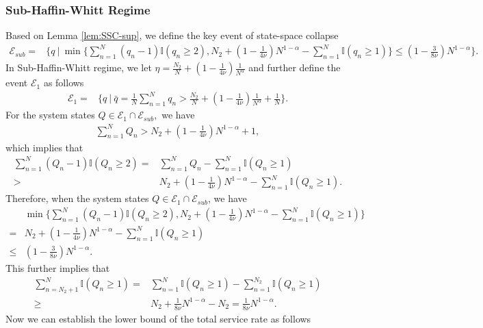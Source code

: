 \documentclass[11pt,oneside,letter]{article}
\begin{document}
\subsubsection*{Sub-Haffin-Whitt Regime}
Based on Lemma \ref{lem:SSC-sup}, we define the key event of state-space collapse 
\begin{align}
\mathcal E_{sub}=&\{q~|~ 
\min\{\sum_{n=1}^{N} (q_n-1)\mathbb{I}(q_n\geq 2), N_2+(1-\frac{1}{4\nu})N^{1-\alpha} -\sum_{n=1}^{N} \mathbb{I}(q_n\geq 1 ) \}\leq (1-\frac{3}{8\nu})  N^{{1-\alpha}}\}.
\end{align}
In Sub-Haffin-Whitt regime, we let $\eta = \frac{N_2}{N} + (1-\frac{1}{4\nu})\frac{1}{N^{\alpha}}$ and further define the event $\mathcal E_1$ as follows 
\begin{align}
\mathcal E_{1}=&\{q~|~ \bar q = \frac{1}{N}\sum_{n=1}^{N} q_n> \frac{N_2}{N} + (1-\frac{1}{4\nu})\frac{1}{N^{\alpha}} + \frac{1}{N}\}. 
\end{align}
For the system states $Q \in \mathcal E_1 \cap \mathcal E_{sub},$ we have
\begin{eqnarray*}
\sum_{n=1}^{N} Q_n > 
N_2+ (1-\frac{1}{4\nu})N^{{1-\alpha}} +1, 
\end{eqnarray*} which implies that 
\begin{align*}
\sum_{n=1}^{N} (Q_n-1)\mathbb{I}({Q_n\geq 2}) =& \sum_{n=1}^{N} Q_n - \sum_{n=1}^{N} \mathbb{I}({Q_n\geq 1}) \nonumber \\
>& N_2+(1-\frac{1}{4\nu})N^{1-\alpha}  - \sum_{n=1}^{N} \mathbb{I}({Q_n\geq 1}).
\end{align*} 
Therefore, when the system states $Q \in \mathcal E_1 \cap \mathcal E_{sub}$, we have
\begin{align*}
&\min\{\sum_{n=1}^{N} (Q_n-1)\mathbb{I}(Q_n\geq 2), N_2+(1-\frac{1}{4\nu})N^{1-\alpha} - \sum_{n=1}^{N} \mathbb{I}(Q_n\geq 1 ) \}\\
= &  N_2+(1-\frac{1}{4\nu})N^{1-\alpha}  - \sum_{n=1}^{N} \mathbb{I}(Q_n\geq 1 )\\
\leq &  (1-\frac{3}{8\nu}) N^{1-\alpha}.
\end{align*} This further implies that 
\begin{align}
    \sum_{n=N_2+1}^{N} \mathbb{I}(Q_n\geq 1) = &\sum_{n=1}^{N} \mathbb{I}(Q_n\geq 1)-\sum_{n=1}^{N_2}  \mathbb{I}(Q_n\geq 1) \nonumber\\
    \geq & N_2+ \frac{1}{8\nu} N^{{1-\alpha}} -N_2
     = \frac{1}{8\nu} N^{{1-\alpha}}. \label{eq: busy sub}
\end{align}
Now we can establish the lower bound of the total service rate as follows
\end{document}
